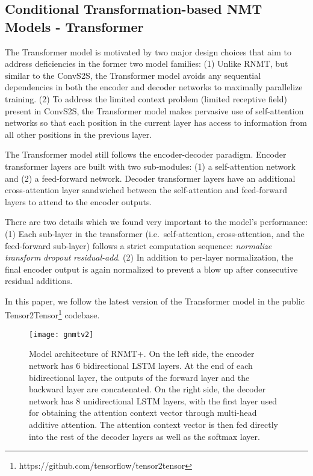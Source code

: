 \documentclass[11pt,a4paper]{article}
\begin{document}
\subsection{Conditional Transformation-based NMT Models - Transformer}
\label{subsec:transf}

The Transformer model \cite{DBLP:journals/corr/VaswaniSPUJGKP17} is motivated
by two major design choices that aim to address deficiencies in the former two
model families: (1) Unlike RNMT, but similar to the ConvS2S, the
Transformer model avoids any sequential dependencies in both the encoder and
decoder networks to maximally parallelize training. (2) To address the limited
context problem (limited receptive field) present in ConvS2S,
the Transformer model makes pervasive use of self-attention networks
\cite{Parikh2016ADA} so that
each position in the current layer has access to information from all other
positions in the previous layer.





The Transformer model still follows the encoder-decoder paradigm. Encoder
transformer layers are built with two sub-modules: (1) a self-attention network
and (2) a feed-forward network. Decoder transformer layers have an additional
cross-attention layer sandwiched between the self-attention and feed-forward
layers to attend to the encoder outputs.




There are two details which we found very important to the model's
performance:  (1) Each sub-layer in the transformer (i.e.~self-attention,
cross-attention, and the feed-forward sub-layer) follows a strict computation
sequence: \textit{normalize}  \textit{transform} 
\textit{dropout} \textit{residual-add}.
(2) In addition to per-layer normalization, the final encoder output is again
normalized to prevent a blow up after consecutive residual additions.


In this paper, we follow the latest version of the Transformer model in the
public Tensor2Tensor\footnote{https://github.com/tensorflow/tensor2tensor} codebase.



\begin{figure*}[t!] \centering
\texttt{[image: gnmtv2]} \caption{Model
architecture of RNMT+. On the left side, the encoder network has 6 bidirectional
LSTM layers. At the end of each bidirectional layer, the outputs of the forward
layer and the backward layer are concatenated.  On the right side, the decoder
network has 8 unidirectional LSTM layers, with the first layer used for
obtaining the attention context vector through multi-head additive attention. The
attention context vector is then fed directly into the rest of the decoder
layers as well as the softmax layer.} \label{fig:gnmtv2} \end{figure*}
\end{document}
